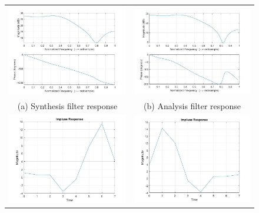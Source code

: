 \begin{figure}[htpb]
\centering
\begin{tabular}{cc}
  \includegraphics[width=80mm]{H_System.jpg} & \includegraphics[width=80mm]{G_System.jpg} \\ [10pt]
(a) Synthesis filter response  & (b) Analysis filter response \\[10pt]
\includegraphics[width=80mm]{H_System_Response.jpg} & \includegraphics[width=80mm]{G_System_Response.jpg} \\ [10pt]

\end{tabular}
\end{figure}
